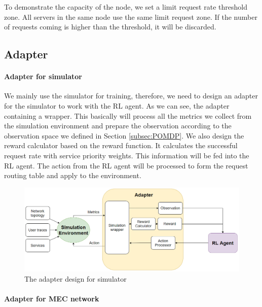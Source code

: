 \documentclass[conference]{IEEEtran}
\begin{document}
To demonstrate the capacity of the node, we set a limit request rate threshold zone. All servers in the same node use the same limit request zone. If the number of requests coming is higher than the threshold, it will be discarded. 

\subsection{Adapter}

\paragraph{Adapter for simulator}

We mainly use the simulator for training, therefore, we need to design an adapter for the simulator to work with the RL agent. As we can see, the adapter containing a wrapper. This basically will process all the metrics we collect from the simulation environment and prepare the observation according to the observation space we defined in Section \ref{subsec:POMDP}. We also design the reward calculator based on the reward function. It calculates the successful request rate with service priority weights. This information will be fed into the RL agent. The action from the RL agent will be processed to form the request routing table and apply to the environment.

\begin{figure}[]
    \centering
    \includegraphics[scale = 0.3]{imgs/adapter_design_simulator.png}
    \caption{The adapter design for simulator}
    \label{fig:adapter_design_simulator}
\end{figure}

\paragraph{Adapter for MEC network}
\end{document}
